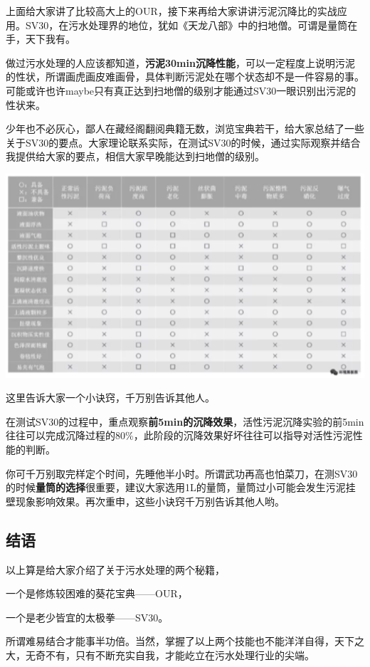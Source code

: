 \documentclass[]{book}
\begin{document}
上面给大家讲了比较高大上的OUR，接下来再给大家讲讲污泥沉降比的实战应用。SV30，在污水处理界的地位，犹如《天龙八部》中的扫地僧。可谓是量筒在手，天下我有。

做过污水处理的人应该都知道，\textbf{污泥30min沉降性能}，可以一定程度上说明污泥的性状，所谓画虎画皮难画骨，具体判断污泥处在哪个状态却不是一件容易的事。可能或许也许maybe只有真正达到扫地僧的级别才能通过SV30一眼识别出污泥的性状来。

少年也不必灰心，鄙人在藏经阁翻阅典籍无数，浏览宝典若干，给大家总结了一些关于SV30的要点。大家理论联系实际，在测试SV30的时候，通过实际观察并结合我提供给大家的要点，相信大家早晚能达到扫地僧的级别。

\includegraphics[width=6.67in]{images/os3}

这里告诉大家一个小诀窍，千万别告诉其他人。

在测试SV30的过程中，重点观察\textbf{前5min的沉降效果}，活性污泥沉降实验的前5min往往可以完成沉降过程的80\%，此阶段的沉降效果好坏往往可以指导对活性污泥性能的判断。

你可千万别取完样定个时间，先睡他半小时。所谓武功再高也怕菜刀，在测SV30的时候\textbf{量筒的选择}很重要，建议大家选用1L的量筒，量筒过小可能会发生污泥挂壁现象影响效果。再次重申，这些小诀窍千万别告诉其他人哟。

\hypertarget{ux7ed3ux8bed-6}{%
\subsection{结语}\label{ux7ed3ux8bed-6}}

以上算是给大家介绍了关于污水处理的两个秘籍，

一个是修炼较困难的葵花宝典------OUR，

一个是老少皆宜的太极拳------SV30。

所谓难易结合才能事半功倍。当然，掌握了以上两个技能也不能洋洋自得，天下之大，无奇不有，只有不断充实自我，才能屹立在污水处理行业的尖端。
\end{document}
